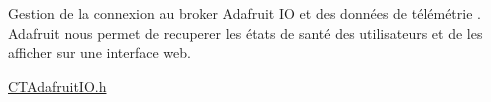 Gestion de la connexion au broker Adafruit IO et des données de télémétrie . Adafruit nous permet de recuperer les états de santé des utilisateurs et de les afficher sur une interface web.

\mbox{\hyperlink{_c_t_adafruit_i_o_8h}{CTAdafruit\+IO.\+h}} 